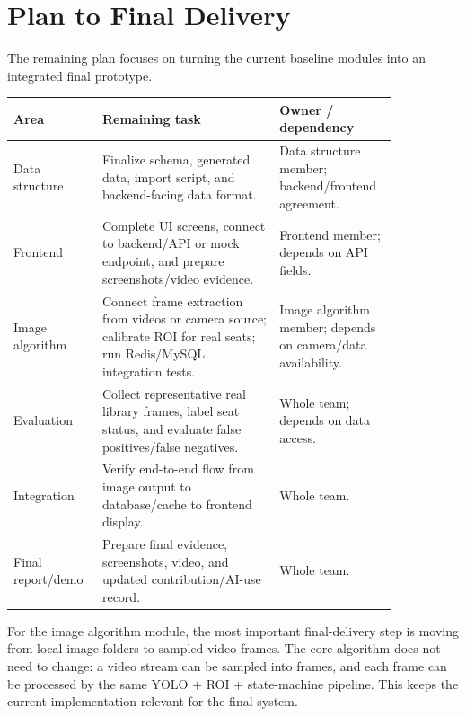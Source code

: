 \section{Plan to Final Delivery}

The remaining plan focuses on turning the current baseline modules into an integrated final prototype.

\begin{longtable}{|p{0.18\linewidth}|p{0.42\linewidth}|p{0.25\linewidth}|}
\hline
\textbf{Area} & \textbf{Remaining task} & \textbf{Owner / dependency} \\
\hline
Data structure & Finalize schema, generated data, import script, and backend-facing data format. & Data structure member; backend/frontend agreement. \\
\hline
Frontend & Complete UI screens, connect to backend/API or mock endpoint, and prepare screenshots/video evidence. & Frontend member; depends on API fields. \\
\hline
Image algorithm & Connect frame extraction from videos or camera source; calibrate ROI for real seats; run Redis/MySQL integration tests. & Image algorithm member; depends on camera/data availability. \\
\hline
Evaluation & Collect representative real library frames, label seat status, and evaluate false positives/false negatives. & Whole team; depends on data access. \\
\hline
Integration & Verify end-to-end flow from image output to database/cache to frontend display. & Whole team. \\
\hline
Final report/demo & Prepare final evidence, screenshots, video, and updated contribution/AI-use record. & Whole team. \\
\hline
\end{longtable}

For the image algorithm module, the most important final-delivery step is moving from local image folders to sampled video frames. The core algorithm does not need to change: a video stream can be sampled into frames, and each frame can be processed by the same YOLO + ROI + state-machine pipeline. This keeps the current implementation relevant for the final system.

